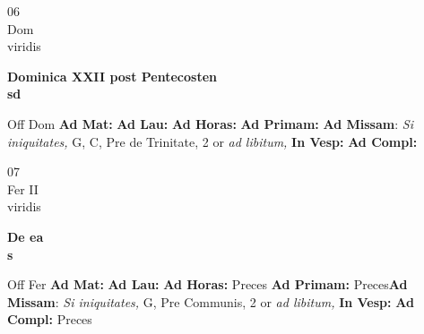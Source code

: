 \documentclass[10pt, openany]{book}
\begin{document}
    \begin{center}
        \begin{minipage}{3.5in}
            \vspace{2em}
            \begin{minipage}{0.5in}
                {\Huge 06} \\
                {\normalsize Dom} \\
                {\normalsize viridis}
            \end{minipage}
            \begin{minipage}{3.0in}
                \textbf{ \large Dominica XXII post Pentecosten \\
                \textnormal{\normalsize sd}} \\ 
            \end{minipage}
            \begin{justify}Off Dom
                \textbf{Ad Mat: }
                \textbf{Ad Lau: }
                \textbf{Ad Horas: }
                \textbf{Ad Primam: }\textbf{Ad Missam}: \textit{Si iniquitates,} G, C, Pre de Trinitate, 2 or \textit{ad libitum,}  
                \textbf{In Vesp: }
                \textbf{Ad Compl: }
            \end{justify}
        \end{minipage}
    \end{center}

    \begin{center}
        \begin{minipage}{3.5in}
            \vspace{2em}
            \begin{minipage}{0.5in}
                {\Huge 07} \\
                {\normalsize Fer II} \\
                {\normalsize viridis}
            \end{minipage}
            \begin{minipage}{3.0in}
                \textbf{ \large De ea \\
                \textnormal{\normalsize s}} \\ 
            \end{minipage}
            \begin{justify}Off Fer
                \textbf{Ad Mat: }
                \textbf{Ad Lau: }
                \textbf{Ad Horas: }Preces
                \textbf{Ad Primam: }Preces\textbf{Ad Missam}: \textit{Si iniquitates,} G, Pre Communis, 2 or \textit{ad libitum,}  
                \textbf{In Vesp: }
                \textbf{Ad Compl: }Preces
            \end{justify}
        \end{minipage}
    \end{center}
\end{document}
